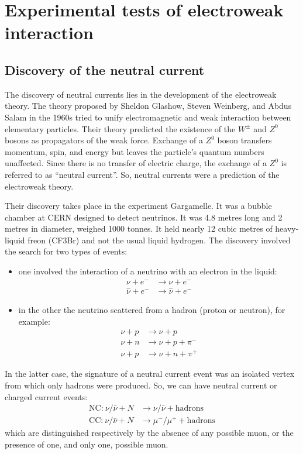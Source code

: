 \documentclass[../../main/main.tex]{subfiles}
\begin{document}

\section{Experimental tests of electroweak interaction}

\subsection{Discovery of the neutral current}
The discovery of neutral currents lies in the development of the electroweak theory. The theory proposed by Sheldon Glashow, Steven Weinberg, and Abdus Salam in the 1960s tried to unify electromagnetic and weak interaction between elementary particles. Their theory predicted the existence of the \( W^{\pm} \) and \( Z^0 \) bosons as propagators of the weak force. Exchange of a \( Z^0 \) boson transfers momentum, spin, and energy but leaves the particle's quantum numbers unaffected. Since there is no transfer of electric charge, the exchange of a \( Z^0 \) is referred to as ``neutral current''. So, neutral currents were a prediction of the electroweak theory.

Their discovery takes place in the experiment Gargamelle. It was a bubble chamber at CERN designed to detect neutrinos. It was 4.8 metres long and 2 metres in diameter, weighed 1000 tonnes. It held nearly 12 cubic metres of heavy-liquid freon (CF3Br) and not the usual liquid hydrogen. The discovery involved the search for two types of events:
\begin{itemize}
	\item one involved the interaction of a neutrino with an electron in the liquid:
		\begin{align}
			\nu + e^- &\longrightarrow \nu + e^-	\\
			\overset{-}{\nu} + e^- &\longrightarrow \overset{-}{\nu} + e^-
		\end{align}
	\item in the other the neutrino scattered from a hadron (proton or neutron), for example:
		\begin{align}
			\nu + p &\longrightarrow \nu + p	\\
			\nu + n &\longrightarrow \nu + p + \pi^-	\\
			\nu + p &\longrightarrow \nu + n + \pi^+
		\end{align}
\end{itemize}
In the latter case, the signature of a neutral current event was an isolated vertex from which only hadrons were produced. So, we can have neutral current or charged current events:
\begin{align}
	\text{NC:} \ \nu/\bar{\nu} + N &\longrightarrow \nu/\bar{\nu} + \text{hadrons}	\\
	\text{CC:} \ \nu/\bar{\nu} + N &\longrightarrow \mu^-/\mu^+ + \text{hadrons}
\end{align}
which are distinguished respectively by the absence of any possible muon, or the presence of one, and only one, possible muon.
\end{document}
